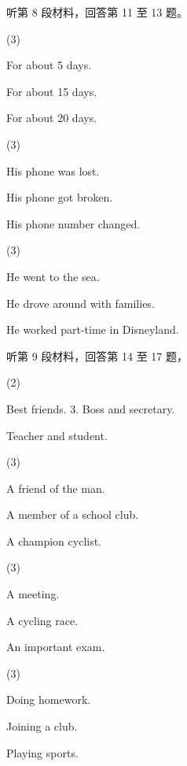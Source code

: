 \documentclass{英语试卷}
\begin{document}
\par 听第 8 段材料，回答第 11 至 13 题。\par
{}
\begin{choices}(3)
  \item For about 5 days.
  \item For about 15 days.
  \item For about 20 days.
\end{choices}
\begin{choices}(3)
  \item His phone was lost.
  \item His phone got broken.
  \item His phone number changed.
\end{choices}
\begin{choices}(3)
  \item He went to the sea.
  \item He drove around with families.
  \item He worked part-time in Disneyland.
\end{choices}
\par 听第 9 段材料，回答第 14 至 17 题，\par
{}
\begin{choices}(2)
  \item Best friends. 3. Boss and secretary.
  \item Teacher and student.
\end{choices}
\begin{choices}(3)
  \item A friend of the man.
  \item A member of a school club.
  \item A champion cyclist.
\end{choices}
\begin{choices}(3)
  \item A meeting.
  \item A cycling race.
  \item An important exam.
\end{choices}
\begin{choices}(3)
  \item Doing homework.
  \item Joining a club.
  \item Playing sports.
\end{choices}
\end{document}
